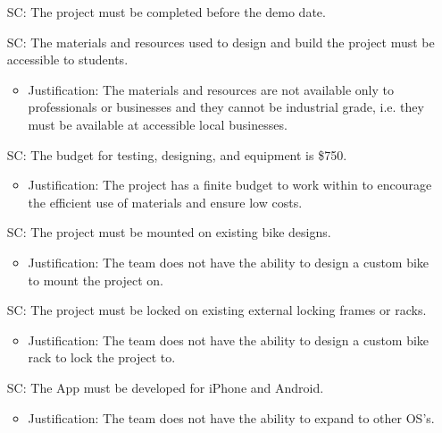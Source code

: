 \documentclass[12pt]{article}
\newcounter{scnum} %
\begin{document}
\begin{itemize}

\item[SC\refstepcounter{scnum}\thescnum\label{SC1}:] The project must be completed before the demo date.

\item[SC\refstepcounter{scnum}\thescnum\label{SC2}:] The materials and resources used to design and build the project must be accessible to students.
	\begin{itemize}
		\item Justification: The materials and resources are not available only to professionals or businesses and they cannot be industrial grade, i.e. they must be available at accessible local businesses.
	\end{itemize} 

\item[SC\refstepcounter{scnum}\thescnum\label{SC3}:] The budget for testing, designing, and equipment is \$750.
	\begin{itemize}
		\item Justification: The project has a finite budget to work within to encourage the efficient use of materials and ensure low costs.
	\end{itemize} 
	
\item[SC\refstepcounter{scnum}\thescnum\label{SC4}:]  The project must be mounted on existing bike designs.
	\begin{itemize}
		\item Justification: The team does not have the ability to design a custom bike to mount the project on. 
	\end{itemize} 	
	
\item[SC\refstepcounter{scnum}\thescnum\label{SC5}:] The project must be locked on existing external locking frames or racks.
	\begin{itemize}
		\item Justification: The team does not have the ability to design a custom bike rack to lock the project to. 
	\end{itemize} 
	
\item[SC\refstepcounter{scnum}\thescnum\label{SC6}:] The App must be developed for iPhone and Android.
	\begin{itemize}
		\item Justification: The team does not have the ability to expand to other OS's.
	\end{itemize} 


\end{itemize}
\end{document}
